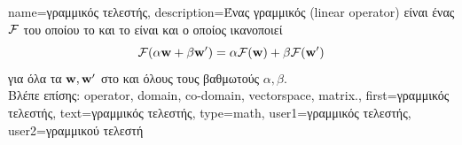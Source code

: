 {name={\foreignlanguage{greek}{γραμμικός τελεστής}},
	description={\foreignlanguage{greek}{Ένας γραμμικός}  
		(linear operator) \foreignlanguage{greek}{είναι ένας}  $\mathcal{F}$ \foreignlanguage{greek}{του οποίου το} 
		 \foreignlanguage{greek}{και το}  \foreignlanguage{greek}{είναι}
		 \foreignlanguage{greek}{και ο οποίος ικανοποιεί} \cite{DunfordSchwartz1988}
		\begin{equation}
			\nonumber
			\mathcal{F}(\alpha {\bf w} + \beta {\bf w}')
			= \alpha \mathcal{F}({\bf w}) + \beta \mathcal{F}({\bf w}')
		\end{equation}
		\foreignlanguage{greek}{για όλα τα ${\bf w},{\bf w}'$ στο}  \foreignlanguage{greek}{και όλους τους 
		βαθμωτούς} $\alpha,\beta$.
							\\
		\foreignlanguage{greek}{Βλέπε επίσης:} \gls{operator}, \gls{domain}, \gls{co-domain}, \gls{vectorspace}, \gls{matrix}.},
	first={\foreignlanguage{greek}{γραμμικός τελεστής}},
	text={\foreignlanguage{greek}{γραμμικός τελεστής}},
	type=math,
	user1={\foreignlanguage{greek}{γραμμικός τελεστής}}, %
	user2={\foreignlanguage{greek}{γραμμικού τελεστή}} %
}

